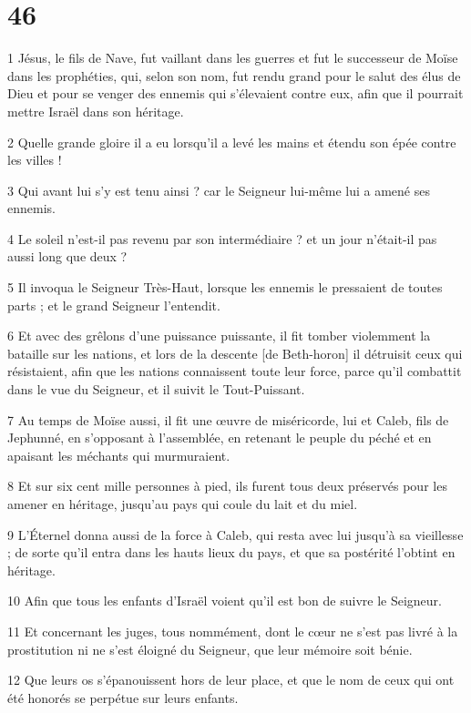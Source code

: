 \chapter{46}

\par 1 Jésus, le fils de Nave, fut vaillant dans les guerres et fut le successeur de Moïse dans les prophéties, qui, selon son nom, fut rendu grand pour le salut des élus de Dieu et pour se venger des ennemis qui s'élevaient contre eux, afin que il pourrait mettre Israël dans son héritage.
\par 2 Quelle grande gloire il a eu lorsqu'il a levé les mains et étendu son épée contre les villes !
\par 3 Qui avant lui s'y est tenu ainsi ? car le Seigneur lui-même lui a amené ses ennemis.
\par 4 Le soleil n'est-il pas revenu par son intermédiaire ? et un jour n'était-il pas aussi long que deux ?
\par 5 Il invoqua le Seigneur Très-Haut, lorsque les ennemis le pressaient de toutes parts ; et le grand Seigneur l'entendit.
\par 6 Et avec des grêlons d'une puissance puissante, il fit tomber violemment la bataille sur les nations, et lors de la descente [de Beth-horon] il détruisit ceux qui résistaient, afin que les nations connaissent toute leur force, parce qu'il combattit dans le vue du Seigneur, et il suivit le Tout-Puissant.
\par 7 Au temps de Moïse aussi, il fit une œuvre de miséricorde, lui et Caleb, fils de Jephunné, en s'opposant à l'assemblée, en retenant le peuple du péché et en apaisant les méchants qui murmuraient.
\par 8 Et sur six cent mille personnes à pied, ils furent tous deux préservés pour les amener en héritage, jusqu'au pays qui coule du lait et du miel.
\par 9 L'Éternel donna aussi de la force à Caleb, qui resta avec lui jusqu'à sa vieillesse ; de sorte qu'il entra dans les hauts lieux du pays, et que sa postérité l'obtint en héritage.
\par 10 Afin que tous les enfants d'Israël voient qu'il est bon de suivre le Seigneur.
\par 11 Et concernant les juges, tous nommément, dont le cœur ne s'est pas livré à la prostitution ni ne s'est éloigné du Seigneur, que leur mémoire soit bénie.
\par 12 Que leurs os s'épanouissent hors de leur place, et que le nom de ceux qui ont été honorés se perpétue sur leurs enfants.
